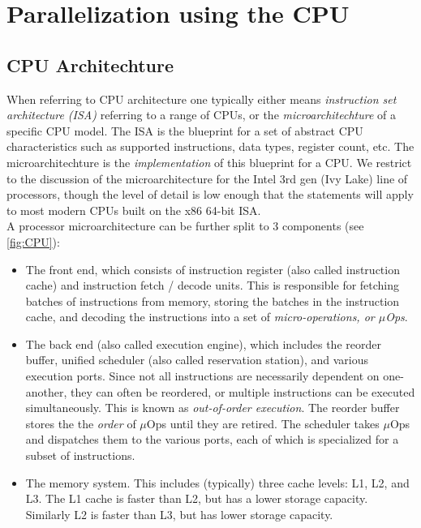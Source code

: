 \section{Parallelization using the CPU}


\subsection{CPU Architechture}

When referring to CPU architecture one typically either means 
\emph{instruction set architecture (ISA)} referring to a range of CPUs, or the 
\emph{microarchitechture} of a specific CPU model. The ISA is the blueprint for a set of 
abstract CPU characteristics such as supported instructions, data types, register count, etc. 
The microarchitechture is the \emph{implementation} of this blueprint for a CPU. We 
restrict to the discussion of the microarchitecture for the Intel 3rd gen (Ivy Lake) 
line of processors, though the level of detail is low enough that the statements will 
apply to most modern CPUs built on the x86 64-bit ISA. \\

A processor microarchitecture can be further split to 3 components (see \autoref{fig:CPU}): 

\begin{itemize}
    \item The front end, which consists of instruction register (also called instruction cache) and instruction fetch / decode 
    units. This is responsible for fetching batches of instructions from memory, storing 
    the batches in the instruction cache, and decoding the instructions into a set of 
    \emph{micro-operations, or $\mu$Ops}.
    \item The back end (also called execution engine), which includes the reorder buffer, 
    unified scheduler (also called reservation station), and various execution ports. 
    Since not all instructions are necessarily dependent on one-another, they can often be 
    reordered, or multiple instructions can be executed simultaneously. This is known as 
    \emph{out-of-order execution}. The reorder buffer stores the the \emph{order} of 
    $\mu$Ops until they are retired. The scheduler takes $\mu$Ops and dispatches them to 
    the various ports, each of which is specialized for a subset of instructions. 
    \item The memory system. This includes (typically) three cache levels: L1, L2, and L3.
    The L1 cache is faster than L2, but has a lower storage capacity. Similarly 
    L2 is faster than L3, but has lower storage capacity. 
\end{itemize}


